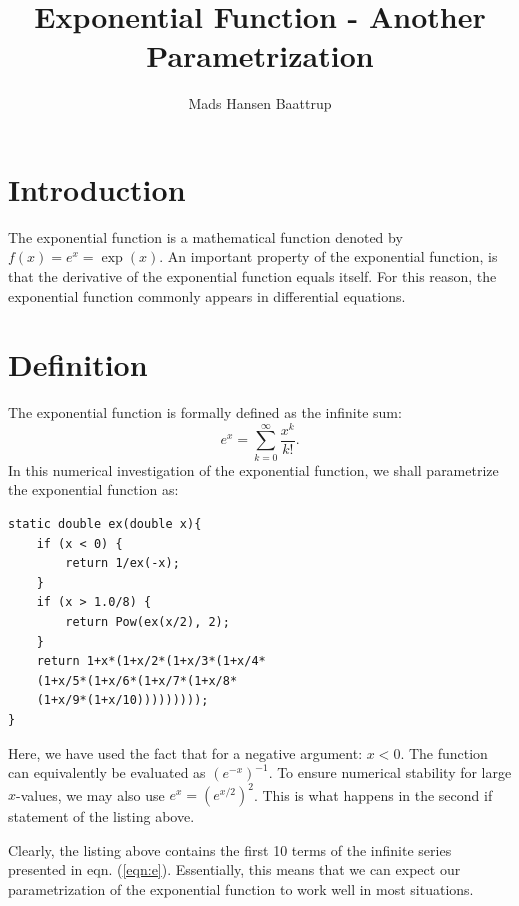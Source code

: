 \documentclass[twocolumn,a4paper]{article}
\begin{document}
\title{Exponential Function - Another Parametrization}
\author{Mads Hansen Baattrup}
\maketitle

\section{Introduction}
The exponential function is a mathematical function denoted by $f(x)=e^x=\exp (x)$. An important property of the exponential function, is that the derivative of the exponential function equals itself. For this reason, the exponential function commonly appears in differential equations.
\section{Definition}
The exponential function is formally defined as the infinite sum:
\begin{equation}
\label{eqn:e}
e^x = \sum_{k=0}^\infty \frac{x^k}{k!}.
\end{equation}
In this numerical investigation of the exponential function, we shall parametrize the exponential function as:
\begin{lstlisting}
static double ex(double x){
    if (x < 0) {
        return 1/ex(-x);
    }
    if (x > 1.0/8) {
        return Pow(ex(x/2), 2);
    } 
    return 1+x*(1+x/2*(1+x/3*(1+x/4*
    (1+x/5*(1+x/6*(1+x/7*(1+x/8*
    (1+x/9*(1+x/10)))))))));    
}
\end{lstlisting}
Here, we have used the fact that for a negative argument: $x<0$. The function can equivalently be evaluated as $(e^{-x})^{-1}$. To ensure numerical stability for large $x$-values, we may also use $e^x=(e^{x/2})^2$. This is what happens in the second if statement of the listing above.
\par
Clearly, the listing above contains the first 10 terms of the infinite series presented in eqn. (\ref{eqn:e}). Essentially, this means that we can expect our parametrization of the exponential function to work well in most situations.
\end{document}
